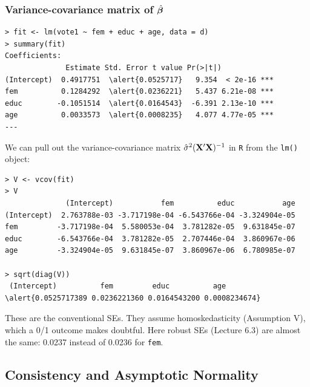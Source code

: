 \documentclass[xcolor=svgnames,9pt,english,aspectratio=169,t]{beamer}
\begin{document}
\begin{frame}[fragile]
\frametitle{Variance-covariance matrix of $\hat{\boldsymbol{\beta}}$}

\begin{Verbatim}[fontsize=\footnotesize, frame=single, label=R Code, commandchars=\\\{\}]
> fit <- lm(vote1 ~ fem + educ + age, data = d)
> summary(fit)
Coefficients:
              Estimate Std. Error t value Pr(>|t|)
(Intercept)  0.4917751  \alert{0.0525717}   9.354  < 2e-16 ***
fem          0.1284292  \alert{0.0236221}   5.437 6.21e-08 ***
educ        -0.1051514  \alert{0.0164543}  -6.391 2.13e-10 ***
age          0.0033573  \alert{0.0008235}   4.077 4.77e-05 ***
---
\end{Verbatim}

\footnotesize
We can pull out the variance-covariance matrix $\hat\sigma^2 (\mathbf{X}'\mathbf{X})^{-1}$ in \texttt{R} from the \texttt{lm()} object:
\begin{Verbatim}[fontsize=\footnotesize, frame=single, label=R Code, commandchars=\\\{\}]
> V <- vcov(fit)
> V
              (Intercept)           fem          educ           age
(Intercept)  2.763788e-03 -3.717198e-04 -6.543766e-04 -3.324904e-05
fem         -3.717198e-04  5.580053e-04  3.781282e-05  9.631845e-07
educ        -6.543766e-04  3.781282e-05  2.707446e-04  3.860967e-06
age         -3.324904e-05  9.631845e-07  3.860967e-06  6.780985e-07

> sqrt(diag(V))
 (Intercept)          fem         educ          age
\alert{0.0525717389 0.0236221360 0.0164543200 0.0008234674}
\end{Verbatim}
These are the conventional SEs. They assume homoskedasticity (Assumption V), which a 0/1 outcome makes doubtful. Here robust SEs (Lecture 6.3) are almost the same: 0.0237 instead of 0.0236 for \texttt{fem}.

\end{frame}

\subsection{Consistency and Asymptotic Normality}
\end{document}
